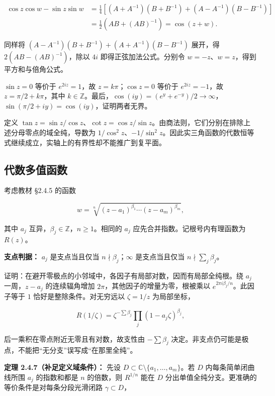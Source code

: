 \documentclass[11pt,a4paper]{article}
\begin{document}
\[
\begin{aligned}
\cos z\cos w-\sin z\sin w
&=\tfrac14[(A+A^{-1})(B+B^{-1})+(A-A^{-1})(B-B^{-1})]\\
&=\tfrac12(AB+(AB)^{-1})=\cos(z+w).
\end{aligned}
\]

同样将 \((A-A^{-1})(B+B^{-1})+(A+A^{-1})(B-B^{-1})\) 展开，得
\(2(AB-(AB)^{-1})\)，除以 \(4i\) 即得正弦加法公式。分别令
\(w=-z\)、\(w=z\)，得到平方和与倍角公式。

\(\sin z=0\) 等价于 \(e^{2iz}=1\)，故 \(z=k\pi\)；\(\cos z=0\) 等价于
\(e^{2iz}=-1\)，故 \(z=\pi/2+k\pi\)，其中
\(k\in\mathbb Z\)。最后，\(\cos(iy)=(e^y+e^{-y})/2\to\infty\)，\(\sin(\pi/2+iy)=\cos(iy)\)，证明两者无界。

定义
\(\tan z=\sin z/\cos z\)、\(\cot z=\cos z/\sin z\)。由商法则，它们分别在排除上述分母零点的域全纯，导数为
\(1/\cos^2z\)、\(-1/\sin^2z\)。因此实三角函数的代数恒等式继续成立，实轴上的有界性却不能推广到复平面。

\subsection{代数多值函数}\label{ch02-s4-ux4ee3ux6570ux591aux503cux51fdux6570}

考虑教材 §2.4.5 的函数

\[
w=\sqrt[n]{(z-a_1)^{\beta_1}\cdots(z-a_m)^{\beta_m}},
\]

其中 \(a_j\) 互异，\(\beta_j\in\mathbb Z\)，\(n\ge1\)。相同的 \(a_j\)
应先合并指数。记根号内有理函数为 \(R(z)\)。

\textbf{支点判据：} \(a_j\) 是支点当且仅当 \(n\nmid\beta_j\)；\(\infty\)
是支点当且仅当 \(n\nmid\sum_j\beta_j\)。

证明：在避开零极点的小邻域中，各因子有局部对数，因而有局部全纯根。绕
\(a_j\) 一周，\(z-a_j\) 的连续辐角增加
\(2\pi\)，其他因子的增量为零，根被乘以
\(e^{2\pi i\beta_j/n}\)。此因子等于 \(1\) 恰好是整除条件。对无穷远以
\(\zeta=1/z\) 为局部坐标，

\[
R(1/\zeta)=\zeta^{-\sum\beta_j}\prod_j(1-a_j\zeta)^{\beta_j},
\]

后一乘积在零点附近无零且有对数，故支性由 \(-\sum\beta_j\)
决定。非支点仍可能是极点，不能把``无分支''误写成``在那里全纯''。

\textbf{定理 2.4.7（补足定义域条件）：} 先设
\(D\subset\mathbb C\setminus\{a_1,\ldots,a_m\}\)。若 \(D\)
内每条简单闭曲线所围 \(a_j\) 的指数和都是 \(n\) 的倍数，则 \(R^{1/n}\)
能在 \(D\) 分出单值全纯分支。更准确的等价条件是对每条分段光滑闭路
\(\gamma\subset D\)，
\end{document}

